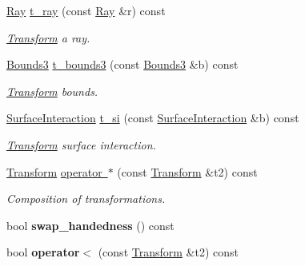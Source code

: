 \begin{DoxyCompactItemize}
\mbox{\hyperlink{classomg_1_1_ray}{Ray}} \mbox{\hyperlink{classomg_1_1_transform_ac96fd6a112b9ab99335a7b84b86f7dc2}{t\+\_\+ray}} (const \mbox{\hyperlink{classomg_1_1_ray}{Ray}} \&r) const
\begin{DoxyCompactList}\small\item\em \mbox{\hyperlink{classomg_1_1_transform}{Transform}} a ray. \end{DoxyCompactList}\item 
\mbox{\hyperlink{classomg_1_1_bounds3}{Bounds3}} \mbox{\hyperlink{classomg_1_1_transform_a5a4c1f700874ad7325bf58b3320f45c1}{t\+\_\+bounds3}} (const \mbox{\hyperlink{classomg_1_1_bounds3}{Bounds3}} \&b) const
\begin{DoxyCompactList}\small\item\em \mbox{\hyperlink{classomg_1_1_transform}{Transform}} bounds. \end{DoxyCompactList}\item 
\mbox{\hyperlink{classomg_1_1_surface_interaction}{Surface\+Interaction}} \mbox{\hyperlink{classomg_1_1_transform_ae3467c19d88d48710c22fdca82a7c81e}{t\+\_\+si}} (const \mbox{\hyperlink{classomg_1_1_surface_interaction}{Surface\+Interaction}} \&b) const
\begin{DoxyCompactList}\small\item\em \mbox{\hyperlink{classomg_1_1_transform}{Transform}} surface interaction. \end{DoxyCompactList}\item 
\mbox{\label{classomg_1_1_transform_a2fe0e2cbc567250803021f7fcc96c11e}} 
\mbox{\hyperlink{classomg_1_1_transform}{Transform}} \mbox{\hyperlink{classomg_1_1_transform_a2fe0e2cbc567250803021f7fcc96c11e}{operator $\ast$}} (const \mbox{\hyperlink{classomg_1_1_transform}{Transform}} \&t2) const
\begin{DoxyCompactList}\small\item\em Composition of transformations. \end{DoxyCompactList}\item 
\mbox{\label{classomg_1_1_transform_a961fbb3fffba14758dd755b4db8aa63b}} 
bool {\bfseries swap\+\_\+handedness} () const
\item 
\mbox{\label{classomg_1_1_transform_a87e6f457d6a8c14b783a1bffbb1f2bab}} 
bool {\bfseries operator$<$} (const \mbox{\hyperlink{classomg_1_1_transform}{Transform}} \&t2) const
\end{DoxyCompactItemize}
